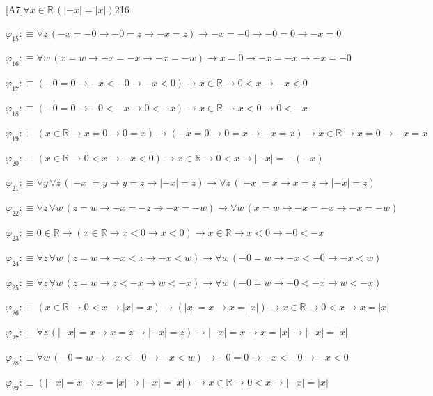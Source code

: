 \begin{fullproof}{[A7]}{$\forall x \in \mathbb{R}\,(\lvert -x \rvert = \lvert x \rvert)$}{216}
\begin{abbrevlist}
\item $\varphi_{15} :\equiv \forall z\,(-x = -0 \to -0 = z \to -x = z) \to -x = -0 \to -0 = 0 \to -x = 0$
\item $\varphi_{16} :\equiv \forall w\,(x = w \to -x = -x \to -x = -w) \to x = 0 \to -x = -x \to -x = -0$
\item $\varphi_{17} :\equiv (-0 = 0 \to -x < -0 \to -x < 0) \to x \in \mathbb{R} \to 0 < x \to -x < 0$
\item $\varphi_{18} :\equiv (-0 = 0 \to -0 < -x \to 0 < -x) \to x \in \mathbb{R} \to x < 0 \to 0 < -x$
\item $\varphi_{19} :\equiv (x \in \mathbb{R} \to x = 0 \to 0 = x) \to (-x = 0 \to 0 = x \to -x = x) \to x \in \mathbb{R} \to x = 0 \to -x = x$
\item $\varphi_{20} :\equiv (x \in \mathbb{R} \to 0 < x \to -x < 0) \to x \in \mathbb{R} \to 0 < x \to \lvert -x \rvert = -(-x)$
\item $\varphi_{21} :\equiv \forall y\,\forall z\,(\lvert -x \rvert = y \to y = z \to \lvert -x \rvert = z) \to \forall z\,(\lvert -x \rvert = x \to x = z \to \lvert -x \rvert = z)$
\item $\varphi_{22} :\equiv \forall z\,\forall w\,(z = w \to -x = -z \to -x = -w) \to \forall w\,(x = w \to -x = -x \to -x = -w)$
\item $\varphi_{23} :\equiv 0 \in \mathbb{R} \to (x \in \mathbb{R} \to x < 0 \to x < 0) \to x \in \mathbb{R} \to x < 0 \to -0 < -x$
\item $\varphi_{24} :\equiv \forall z\,\forall w\,(z = w \to -x < z \to -x < w) \to \forall w\,(-0 = w \to -x < -0 \to -x < w)$
\item $\varphi_{25} :\equiv \forall z\,\forall w\,(z = w \to z < -x \to w < -x) \to \forall w\,(-0 = w \to -0 < -x \to w < -x)$
\item $\varphi_{26} :\equiv (x \in \mathbb{R} \to 0 < x \to \lvert x \rvert = x) \to (\lvert x \rvert = x \to x = \lvert x \rvert) \to x \in \mathbb{R} \to 0 < x \to x = \lvert x \rvert$
\item $\varphi_{27} :\equiv \forall z\,(\lvert -x \rvert = x \to x = z \to \lvert -x \rvert = z) \to \lvert -x \rvert = x \to x = \lvert x \rvert \to \lvert -x \rvert = \lvert x \rvert$
\item $\varphi_{28} :\equiv \forall w\,(-0 = w \to -x < -0 \to -x < w) \to -0 = 0 \to -x < -0 \to -x < 0$
\item $\varphi_{29} :\equiv (\lvert -x \rvert = x \to x = \lvert x \rvert \to \lvert -x \rvert = \lvert x \rvert) \to x \in \mathbb{R} \to 0 < x \to \lvert -x \rvert = \lvert x \rvert$

\end{abbrevlist}
\end{fullproof}
